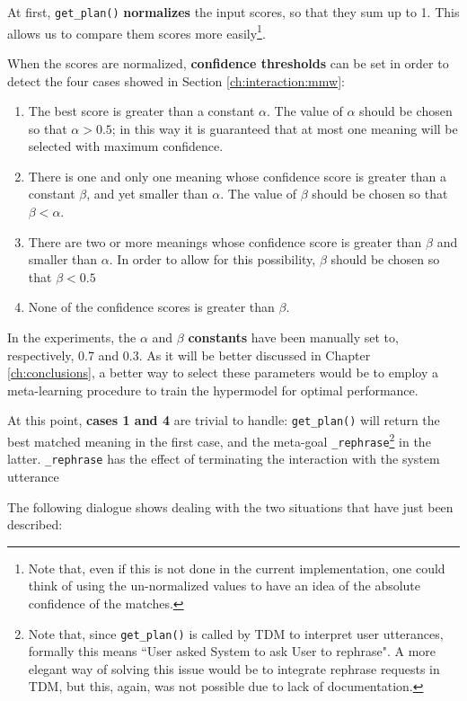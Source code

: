 At first, \texttt{get\_plan()} \textbf{normalizes} the input scores, so that they sum up to 1. This allows us to compare them scores more easily\footnote{Note that, even if this is not done in the current implementation, one could think of using the un-normalized values to have an idea of the absolute confidence of the matches.}.

When the scores are normalized, \textbf{confidence thresholds} can be set in order to detect the four cases showed in Section \ref{ch:interaction:mmw}:
\begin{enumerate}
	\item The best score is greater than a constant $\alpha$. The value of $\alpha$ should be chosen so that $\alpha > 0.5$; in this way it is guaranteed that at most one meaning will be selected with maximum confidence.
	\item There is one and only one meaning whose confidence score is greater than a constant $\beta$, and yet smaller than $\alpha$. The value of $\beta$ should be chosen so that $\beta < \alpha$.
	\item There are two or more meanings whose confidence score is greater than $\beta$ and smaller than $\alpha$. In order to allow for this possibility, $\beta$ should be chosen so that $\beta < 0.5$
	\item None of the confidence scores is greater than $\beta$.
\end{enumerate}

In the experiments, the $\alpha$ and $\beta$ \textbf{constants} have been manually set to, respectively, 0.7 and 0.3. As it will be better discussed in Chapter \ref{ch:conclusions}, a better way to select these parameters would be to employ a meta-learning procedure to train the hypermodel for optimal performance.

At this point, \textbf{cases 1 and 4} are trivial to handle: \texttt{get\_plan()} will return the best matched meaning in the first case, and the meta-goal \texttt{\_rephrase}\footnote{Note that, since \texttt{get\_plan()} is called by TDM to interpret user utterances, formally this means ``User asked System to ask User to rephrase". A more elegant way of solving this issue would be to integrate rephrase requests in TDM, but this, again, was not possible due to lack of documentation.} in the latter. \texttt{\_rephrase} has the effect of terminating the interaction with the system utterance

The following dialogue shows \pname dealing with the two situations that have just been described:

